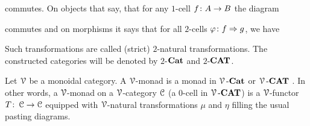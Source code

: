 \documentclass[a4paper,11pt,oneside,openany]{scrbook}
\begin{document}
\begin{exmp}
\begin{center}
	\end{center}
	commutes. On objects that say, that for any $1$-cell $f \colon A \to B$ the diagram
	\begin{center}
	\end{center}
	commutes and on morphisms it says that for all $2$-cells $\varphi \colon f \Rightarrow g$, we have
	\begin{center}
	\end{center}
	Such transformations are called (strict) $2$-natural transformations. The constructed categories will be denoted by $2$-${\normalfont\textbf{Cat}}$ and $2$-${\normalfont\textbf{CAT}}$.
\end{exmp}

\begin{defn}
	Let $\operatorname{\mathcal{V}}$ be a monoidal category. A $\operatorname{\mathcal{V}}$-monad is a monad in $\operatorname{\mathcal{V}}\mbox{-}{\normalfont\textbf{Cat}}$ or $\operatorname{\mathcal{V}}\mbox{-}{\normalfont\textbf{CAT}}$%
	. In other words, a $\operatorname{\mathcal{V}}$-monad on a $\operatorname{\mathcal{V}}$-category $\operatorname{\mathcal{C}}$ (a $0$-cell in $\operatorname{\mathcal{V}}\mbox{-}{\normalfont\textbf{CAT}}$) is a $\operatorname{\mathcal{V}}$-functor $T\colon\operatorname{\mathcal{C}}\to\operatorname{\mathcal{C}}$ equipped with $\operatorname{\mathcal{V}}$-natural transformations $\mu$ and $\eta$ filling the usual pasting diagrams.
\end{defn}
\end{document}
